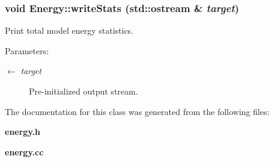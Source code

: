 \subsubsection{\setlength{\rightskip}{0pt plus 5cm}void Energy::write\-Stats (std::ostream \& {\em target})}\label{classEnergy_818c911e57dd9c7d7be0c8b22f2f1957}


Print total model energy statistics.

\begin{Desc}
\item[Parameters:]
\begin{description}
\item[\mbox{$\leftarrow$} {\em target}]Pre-initialized output stream. \end{description}
\end{Desc}


The documentation for this class was generated from the following files:\begin{CompactItemize}
\item 
{\bf energy.h}\item 
{\bf energy.cc}\end{CompactItemize}
